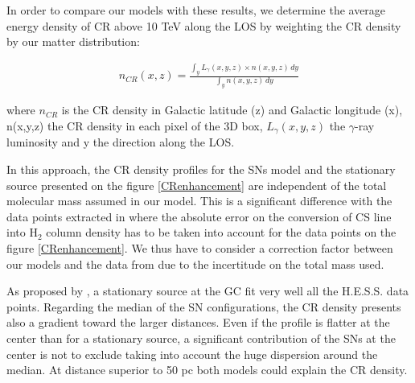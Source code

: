\documentclass[a4paper,fleqn,usenatbib]{mnras}
\begin{document}
In order to compare our models with these results, we determine the average energy density of CR above 10 TeV along the LOS by weighting the CR density by our matter distribution:
\begin{center}
\begin{eqnarray}
n_{CR}(x,z) = \frac{\int_{y} L_{\gamma}(x,y,z) \times n(x,y,z) \, dy }{\int_{y} n(x,y,z) \, dy }
\end{eqnarray}
\end{center}
where $n_{CR}$ is the CR density in Galactic latitude (z) and Galactic longitude (x), n(x,y,z) the CR density in each pixel of the 3D box, $L_{\gamma}(x,y,z)$ the $\gamma$-ray luminosity and y the direction along the LOS.

In this approach, the CR density profiles for the SNs model and the stationary source presented on the figure \ref{CRenhancement} are independent of the total molecular mass assumed in our model. This is a significant difference with the data points extracted in \citet{2016Natur.531..476H} where the absolute error on the conversion of CS line into $\mathrm H_2$ column density has to be taken into account for the data points on the figure \ref{CRenhancement}. We thus have to consider a correction factor between our models and the data from \citet{2016Natur.531..476H}  due to the incertitude on the total mass used.

As proposed by \citet{2016Natur.531..476H}, a stationary source at the GC fit very well all the H.E.S.S. data points. Regarding the median of the SN configurations, the CR density presents also a gradient toward the larger distances. Even if the profile is flatter at the center than for a stationary source, a significant contribution of the SNs at the center is not to exclude taking into account the huge dispersion around the median. At distance superior to 50 pc both models could explain the CR density. 
\end{document}
